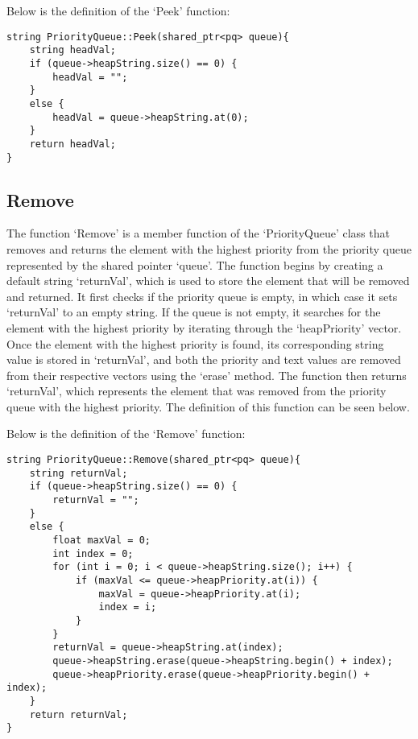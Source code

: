 \begin{highlight}

Below is the definition of the `Peek' function:

\horizontalline

\begin{verbatim}
string PriorityQueue::Peek(shared_ptr<pq> queue){
    string headVal;
    if (queue->heapString.size() == 0) {
        headVal = "";
    }
    else {
        headVal = queue->heapString.at(0);
    }
    return headVal;
}
\end{verbatim}

\end{highlight}

\subsection*{Remove}

The function `Remove' is a member function of the `PriorityQueue' class that removes and returns the element with the highest priority from the priority queue represented by the shared pointer `queue'. The function 
begins by creating a default string `returnVal', which is used to store the element that will be removed and returned. It first checks if the priority queue is empty, in which case it sets `returnVal' to an empty 
string. If the queue is not empty, it searches for the element with the highest priority by iterating through the `heapPriority' vector. Once the element with the highest priority is found, its corresponding string 
value is stored in `returnVal', and both the priority and text values are removed from their respective vectors using the `erase' method. The function then returns `returnVal', which represents the element that was 
removed from the priority queue with the highest priority. The definition of this function can be seen below.

\begin{highlight}

Below is the definition of the `Remove' function:

\horizontalline

\begin{verbatim}
string PriorityQueue::Remove(shared_ptr<pq> queue){
    string returnVal;
    if (queue->heapString.size() == 0) {
        returnVal = "";
    }
    else {
        float maxVal = 0;
        int index = 0;
        for (int i = 0; i < queue->heapString.size(); i++) {
            if (maxVal <= queue->heapPriority.at(i)) {
                maxVal = queue->heapPriority.at(i);
                index = i;
            }
        }
        returnVal = queue->heapString.at(index);
        queue->heapString.erase(queue->heapString.begin() + index);
        queue->heapPriority.erase(queue->heapPriority.begin() + index);
    }
    return returnVal;
}
\end{verbatim}

\end{highlight}